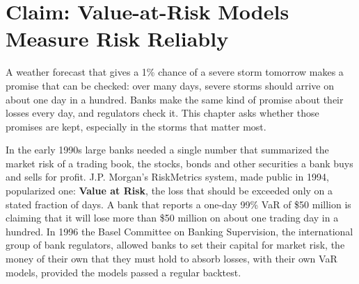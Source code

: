\makeatletter
{}
\makeatother

\chapter{Claim: Value-at-Risk Models Measure Risk Reliably}
\label{ch:11}

A weather forecast that gives a 1\% chance of a severe storm tomorrow makes a promise that can be checked: over many days, severe storms should arrive on about one day in a hundred. Banks make the same kind of promise about their losses every day, and regulators check it. This chapter asks whether those promises are kept, especially in the storms that matter most.

In the early 1990s large banks needed a single number that summarized the market risk of a trading book, the stocks, bonds and other securities a bank buys and sells for profit. J.P. Morgan's RiskMetrics system, made public in 1994, popularized one: \textbf{Value at Risk}, the loss that should be exceeded only on a stated fraction of days. A bank that reports a one-day 99\% VaR of \$50 million is claiming that it will lose more than \$50 million on about one trading day in a hundred. In 1996 the Basel Committee on Banking Supervision, the international group of bank regulators, allowed banks to set their capital for market risk, the money of their own that they must hold to absorb losses, with their own VaR models, provided the models passed a regular backtest.


